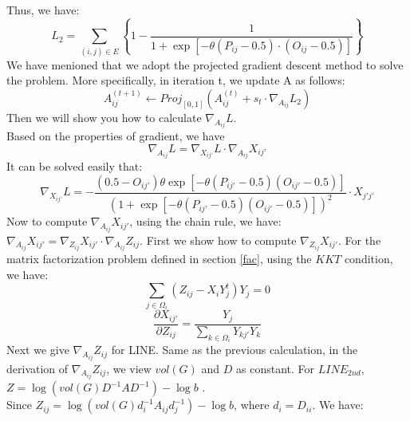 \documentclass{acmtog} %
\begin{document}
\indent Thus, we have:
\begin{equation}
L_2= \sum _ { (i,j)\in E }  \left\{ 1 - \frac { 1 } { 1 + \exp \left[ - \theta \left( P _ { ij } - 0.5 \right) \cdot \left(  O_{ij} - 0.5 \right) \right] } \right\}
\end{equation}
We have menioned that we adopt the projected gradient descent method to solve the problem. More specifically, in iteration t, we
update A as follows:
\begin{equation}
A _ {ij} ^ { ( t + 1 ) } \leftarrow { Proj } _ { [ 0,1 ] } \left( A _{ij} ^ {( t ) } + s _ { t } \cdot \nabla _ { A_{ij} } L_2 \right)
\end{equation}
Then we will show you how to calculate $\nabla _ { A_{ij} } L$.\\
\indent Based on the properties of gradient, we have 
\begin{equation}
\nabla _ { A_{ij} } L = \nabla _ { X_{ij'} } L \cdot \nabla _ { A_{ij} } X_{ij'}
\end{equation}
It can be solved easily that:
\begin{equation}
\nabla _ { X_{ij'} } L=- \frac {\left(0.5-O_{ij'} \right)\theta\exp \left[ -\theta(P_{ij'}-0.5)(O_{ij'}-0.5)\right] } { \left( 1 + \exp \left[- \theta(P_{ij'}-0.5)(O_{ij'}-0.5)\right] \right)^{2}} \cdot X_{j'j'}
\end{equation}
Now to compute $\nabla _ { A_{ij} } X_{ij'}$, using the chain rule, we have: $\nabla _ { A_{ij} } X_{ij'} =
\nabla _ { Z_{ij} } X_{ij'} · \nabla _ { A_{ij} } Z_{ij}$. First we show how to compute $\nabla _ { Z_{ij} } X_{ij'}$. For the matrix factorization problem defined in section \ref{fac}, using the $KKT$ condition, we have:
\begin{equation}
\sum _ { j \in \Omega _ { i } } \left( Z _ { i j } - X _ { i } Y _ { j } ^ { t } \right) Y _ { j } = 0
\end{equation}
\begin{equation}
\frac { \partial X _ { ij' } } { \partial Z _ { i j } } =  \frac{Y _ { j }}{ \sum _ { k \in \Omega _ { i } } Y _ { kj'} Y _ { k } }
\end{equation}
Next we give $\nabla _ { A_{ij} } Z_{ij}$ for LINE. Same as the previous calculation, in the derivation of $\nabla _ { A_{ij} } Z_{ij}$,
we view $vol(G)$ and $D$ as constant. For $LINE_{2nd}$, $Z = \log \left( { vol } ( G ) D ^ { - 1 } A D ^ { - 1 } \right) - \log b$
. \\
\indent Since $Z _ { i j } = \log \left( v o l ( G ) d _ { i } ^ { - 1 } A _ { i j } d _ { j } ^ { - 1 } \right) - \log b$, where $d_i=D_{ii}$. We have:
\end{document}
